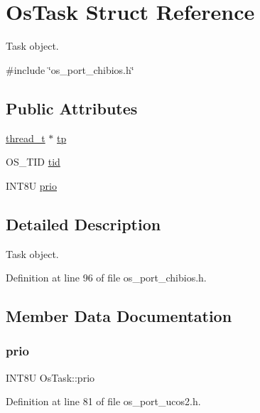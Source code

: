 \hypertarget{structOsTask}{}\section{Os\+Task Struct Reference}
\label{structOsTask}


Task object.  




{\ttfamily \#include \char`\"{}os\+\_\+port\+\_\+chibios.\+h\char`\"{}}

\subsection*{Public Attributes}
\begin{DoxyCompactItemize}
\item 
\hyperlink{os__port__chibios_8h_a608886e38de551d883250e166014c151}{thread\+\_\+t} $\ast$ \hyperlink{structOsTask_a15ff6cfe36feccb799584246a1ce065f}{tp}
\item 
O\+S\+\_\+\+T\+ID \hyperlink{structOsTask_a2a02b3e258d43358e0e7200ca6d530cc}{tid}
\item 
I\+N\+T8U \hyperlink{structOsTask_adeb9bcc45dc0134bc6603bbe09060f76}{prio}
\end{DoxyCompactItemize}


\subsection{Detailed Description}
Task object. 

Definition at line 96 of file os\+\_\+port\+\_\+chibios.\+h.



\subsection{Member Data Documentation}
\mbox{\label{structOsTask_adeb9bcc45dc0134bc6603bbe09060f76}} 
\subsubsection{\texorpdfstring{prio}{prio}}
{\footnotesize\ttfamily I\+N\+T8U Os\+Task\+::prio}



Definition at line 81 of file os\+\_\+port\+\_\+ucos2.\+h.

\mbox{\label{structOsTask_a2a02b3e258d43358e0e7200ca6d530cc}} 
